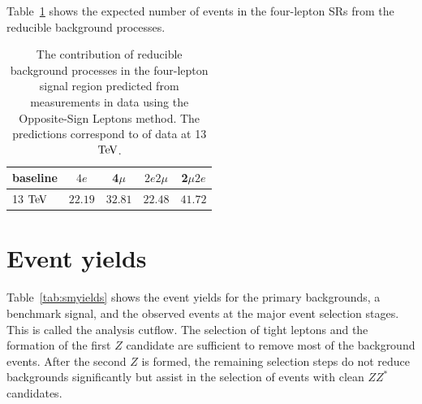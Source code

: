 Table~\ref{tab:reducibleMethodA} shows the expected number of
events in the four-lepton SRs from the reducible background processes. 

\begin{table}[h]
\begin{center}
     \begin{tabular}{| l | c | c | c | c |} \hline
 baseline	& $4e$ 	 & 4$\mu$ & $2e2\mu$  & 2$\mu2e$   \\ \hline \hline
 13 $\mathrm{Te\kern -0.1em V}$		& $22.19$ & $32.81$ & $22.48$    & $41.72$  \\  \hline
 	\end{tabular}
\end{center}
    \caption{ The contribution of reducible background
    processes in the four-lepton signal region predicted from measurements in data
    using the Opposite-Sign Leptons method. The predictions correspond to \usedLumi of data at 13 $\mathrm{Te\kern -0.1em V}$.}
     \label{tab:reducibleMethodA}
\end{table}


\section{Event yields}

Table~\ref{tab:smyields} shows the event yields for the primary backgrounds, a benchmark signal, and the observed events at the major event selection stages. This is called the analysis cutflow. The selection of tight leptons and the formation of the first $Z$ candidate are sufficient to remove most of the background events. After the second $Z$ is formed, the remaining selection steps do not reduce backgrounds significantly but assist in the selection of events with clean $ZZ^*$ candidates. 

